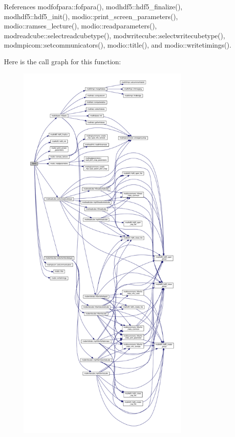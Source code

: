 References modfofpara\-::fofpara(), modhdf5\-::hdf5\-\_\-finalize(), modhdf5\-::hdf5\-\_\-init(), modio\-::print\-\_\-screen\-\_\-parameters(), modio\-::ramses\-\_\-lecture(), modio\-::readparameters(), modreadcube\-::selectreadcubetype(), modwritecube\-::selectwritecubetype(), modmpicom\-::setcommunicators(), modio\-::title(), and modio\-::writetimings().



Here is the call graph for this function\-:\nopagebreak
\begin{figure}[H]
\begin{center}
\leavevmode
\includegraphics[height=550pt]{pfof__snap_8f90_ae44d28f09de4222a58811986e6e2a1d5_cgraph}
\end{center}
\end{figure}


